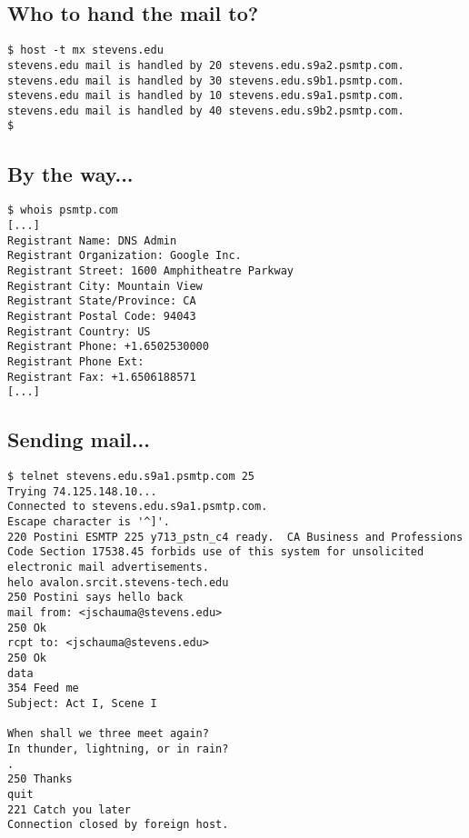 \documentclass[xga]{xdvislides}
\begin{document}
\subsection{Who to hand the mail to?}
\newcommand{\smallish}{\fontsize{16}{16}\selectfont}
\begin{verbatim}
$ host -t mx stevens.edu
stevens.edu mail is handled by 20 stevens.edu.s9a2.psmtp.com.
stevens.edu mail is handled by 30 stevens.edu.s9b1.psmtp.com.
stevens.edu mail is handled by 10 stevens.edu.s9a1.psmtp.com.
stevens.edu mail is handled by 40 stevens.edu.s9b2.psmtp.com.
$
\end{verbatim}
\Normalsize

\subsection{By the way...}
\begin{verbatim}
$ whois psmtp.com
[...]
Registrant Name: DNS Admin
Registrant Organization: Google Inc.
Registrant Street: 1600 Amphitheatre Parkway
Registrant City: Mountain View
Registrant State/Province: CA
Registrant Postal Code: 94043
Registrant Country: US
Registrant Phone: +1.6502530000
Registrant Phone Ext:
Registrant Fax: +1.6506188571
[...]
\end{verbatim}

\subsection{Sending mail...}
\smallish
\begin{verbatim}
$ telnet stevens.edu.s9a1.psmtp.com 25
Trying 74.125.148.10...
Connected to stevens.edu.s9a1.psmtp.com.
Escape character is '^]'.
220 Postini ESMTP 225 y713_pstn_c4 ready.  CA Business and Professions
Code Section 17538.45 forbids use of this system for unsolicited
electronic mail advertisements.
helo avalon.srcit.stevens-tech.edu
250 Postini says hello back
mail from: <jschauma@stevens.edu>
250 Ok
rcpt to: <jschauma@stevens.edu>
250 Ok
data
354 Feed me
Subject: Act I, Scene I

When shall we three meet again?
In thunder, lightning, or in rain?
.
250 Thanks
quit
221 Catch you later
Connection closed by foreign host.
\end{verbatim}
\Normalsize
\end{document}
